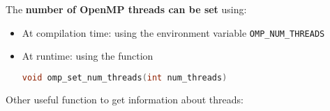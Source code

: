 \noindent
The \textbf{number of OpenMP threads can be set} using:
\begin{itemize}
    \item At compilation time: using the environment variable \texttt{OMP\_NUM\_THREADS}
    \item At runtime: using the function
    \begin{openmpbox}
        \begin{lstlisting}[language=C++]
void omp_set_num_threads(int num_threads)\end{lstlisting}
    \end{openmpbox}
\end{itemize}
Other useful function to get information about threads:

